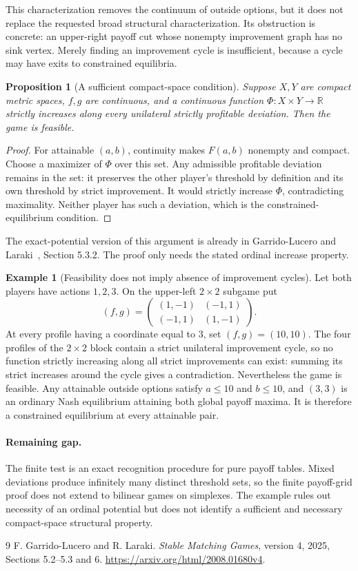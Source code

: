 \documentclass[11pt]{article}
\newtheorem{proposition}{Proposition}
\theoremstyle{definition}
\newtheorem{example}{Example}
\theoremstyle{remark}
\begin{document}
This characterization removes the continuum of outside options, but it does not replace the requested broad structural characterization. Its obstruction is concrete: an upper-right payoff cut whose nonempty improvement graph has no sink vertex. Merely finding an improvement cycle is insufficient, because a cycle may have exits to constrained equilibria.

\begin{proposition}[A sufficient compact-space condition]
Suppose $X,Y$ are compact metric spaces, $f,g$ are continuous, and a continuous function $\Phi:X\times Y\to\mathbb R$ strictly increases along every unilateral strictly profitable deviation. Then the game is feasible.
\end{proposition}
\begin{proof}
For attainable $(a,b)$, continuity makes $F(a,b)$ nonempty and compact. Choose a maximizer of $\Phi$ over this set. Any admissible profitable deviation remains in the set: it preserves the other player's threshold by definition and its own threshold by strict improvement. It would strictly increase $\Phi$, contradicting maximality. Neither player has such a deviation, which is the constrained-equilibrium condition.
\end{proof}

The exact-potential version of this argument is already in Garrido-Lucero and Laraki~\cite{source}, Section 5.3.2. The proof only needs the stated ordinal increase property.

\begin{example}[Feasibility does not imply absence of improvement cycles]
Let both players have actions $1,2,3$. On the upper-left $2\times2$ subgame put
\[
 (f,g)=\begin{pmatrix}(1,-1)&(-1,1)\\(-1,1)&(1,-1)\end{pmatrix}.
\]
At every profile having a coordinate equal to $3$, set $(f,g)=(10,10)$. The four profiles of the $2\times2$ block contain a strict unilateral improvement cycle, so no function strictly increasing along all strict improvements can exist: summing its strict increases around the cycle gives a contradiction. Nevertheless the game is feasible. Any attainable outside options satisfy $a\leq10$ and $b\leq10$, and $(3,3)$ is an ordinary Nash equilibrium attaining both global payoff maxima. It is therefore a constrained equilibrium at every attainable pair.
\end{example}

\paragraph{Remaining gap.}
The finite test is an exact recognition procedure for pure payoff tables. Mixed deviations produce infinitely many distinct threshold sets, so the finite payoff-grid proof does not extend to bilinear games on simplexes. The example rules out necessity of an ordinal potential but does not identify a sufficient and necessary compact-space structural property.

\begin{thebibliography}{9}
 F. Garrido-Lucero and R. Laraki.
\emph{Stable Matching Games}, version 4, 2025, Sections 5.2--5.3 and 6.
\url{https://arxiv.org/html/2008.01680v4}.
\end{thebibliography}
\end{document}
